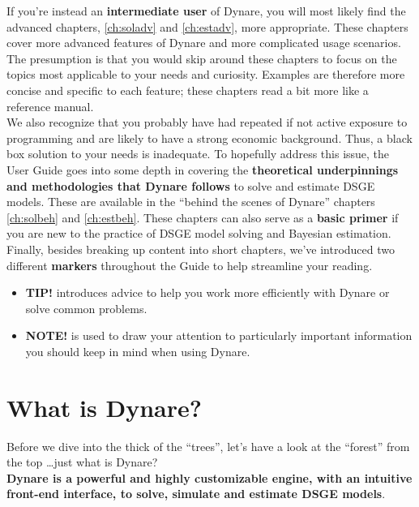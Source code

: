 If you're instead an \textbf{intermediate user} of Dynare, you will most likely find the advanced chapters, \ref{ch:soladv} and \ref{ch:estadv}, more appropriate. These chapters cover more advanced features of Dynare and more complicated usage scenarios. The presumption is that you would skip around these chapters to focus on the topics most applicable to your needs and curiosity. Examples are therefore more concise and specific to each feature; these chapters read a bit more like a reference manual.\\

We also recognize that you probably have had repeated if not active exposure to programming and are likely to have a strong economic background. Thus, a black box solution to your needs is inadequate. To hopefully address this issue, the User Guide goes into some depth in covering the \textbf{theoretical underpinnings and methodologies that Dynare follows} to solve and estimate DSGE models. These are available in the ``behind the scenes of Dynare'' chapters \ref{ch:solbeh} and \ref{ch:estbeh}. These chapters can also serve as a \textbf{basic primer} if you are new to the practice of DSGE model solving and Bayesian estimation. \\

Finally, besides breaking up content into short chapters, we've introduced two different \textbf{markers} throughout the Guide to help streamline your reading.
\begin{itemize}
\item \textbf{\textsf{TIP!}} introduces advice to help you work more efficiently with Dynare or solve common problems.  
\item \textbf{\textsf{NOTE!}} is used to draw your attention to particularly important information you should keep in mind when using Dynare. 
\end{itemize} 


\section{What is Dynare?}
Before we dive into the thick of the ``trees'', let's have a look at the ``forest'' from the top \ldots just what is Dynare? \\

\textbf{Dynare is a powerful and highly customizable engine, with an intuitive front-end interface, to solve, simulate and estimate DSGE models}. \\

